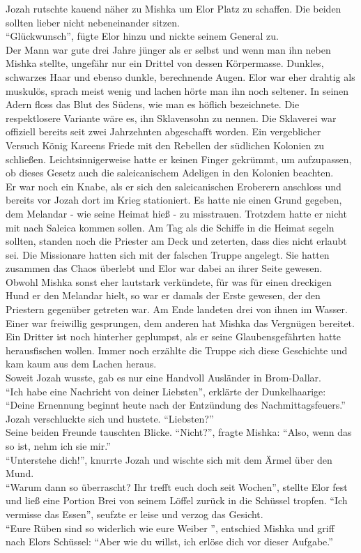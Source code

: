 Jozah rutschte kauend näher zu Mishka um Elor Platz zu schaffen. Die beiden sollten lieber nicht 
nebeneinander sitzen.\\
``Glückwunsch'', fügte Elor hinzu und nickte seinem General zu.\\
Der Mann war gute drei Jahre jünger als er selbst und wenn man ihn neben Mishka stellte, ungefähr 
nur ein Drittel von dessen Körpermasse. Dunkles, schwarzes Haar und ebenso dunkle, berechnende 
Augen. Elor war eher drahtig als muskulös, sprach meist wenig und lachen hörte man ihn noch 
seltener. In seinen Adern floss das Blut des Südens, wie man es höflich bezeichnete. Die 
respektlosere Variante wäre es, ihn Sklavensohn zu nennen. Die Sklaverei war offiziell bereits seit 
zwei Jahrzehnten abgeschafft worden. Ein vergeblicher Versuch König Kareens Friede mit den Rebellen 
der südlichen Kolonien zu schließen. Leichtsinnigerweise hatte er keinen Finger gekrümmt, um 
aufzupassen, ob dieses Gesetz auch die saleicanischem Adeligen in den Kolonien beachten.\\
Er war noch ein Knabe, als er sich den saleicanischen Eroberern anschloss und bereits vor Jozah 
dort im Krieg stationiert. Es hatte nie einen Grund gegeben, dem Melandar - wie seine Heimat hieß - 
zu misstrauen. Trotzdem hatte er nicht mit nach Saleica kommen sollen. Am Tag als die Schiffe in 
die Heimat segeln sollten, standen noch die Priester am Deck und zeterten, dass dies nicht erlaubt 
sei. Die Missionare hatten sich mit der falschen Truppe angelegt. Sie hatten zusammen das Chaos 
überlebt und Elor war dabei an ihrer Seite gewesen. Obwohl Mishka sonst eher lautstark verkündete, 
für was für einen dreckigen Hund er den Melandar hielt, so war er damals der Erste gewesen, der den 
Priestern gegenüber getreten war. Am Ende landeten drei von ihnen im Wasser. Einer war freiwillig 
gesprungen, dem anderen hat Mishka das Vergnügen bereitet. Ein Dritter ist noch hinterher 
geplumpst, als er seine Glaubensgefährten hatte herausfischen wollen. Immer noch erzählte die 
Truppe sich diese Geschichte und kam kaum aus dem Lachen heraus.\\
Soweit Jozah wusste, gab es nur eine Handvoll Ausländer in Brom-Dallar.\\
``Ich habe eine Nachricht von deiner Liebsten'', erklärte der Dunkelhaarige: ``Deine Ernennung 
beginnt heute nach der Entzündung des Nachmittagsfeuers.''\\
Jozah verschluckte sich und hustete. ``Liebsten?''\\
Seine beiden Freunde tauschten Blicke. ``Nicht?'', fragte Mishka: ``Also, wenn das so ist, nehm ich 
sie mir.''\\
``Unterstehe dich!'', knurrte Jozah und wischte sich mit dem Ärmel über den Mund.\\
``Warum dann so überrascht? Ihr trefft euch doch seit Wochen'', stellte Elor fest und ließ eine 
Portion Brei von seinem Löffel zurück in die Schüssel tropfen. ``Ich vermisse das Essen'', seufzte 
er leise und verzog das Gesicht.\\
``Eure Rüben sind so widerlich wie eure Weiber '', entschied Mishka und griff nach Elors Schüssel: 
``Aber wie du willst, ich erlöse dich vor dieser Aufgabe.''\\

